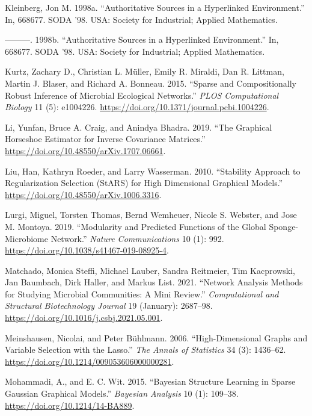 \documentclass[
  a4paper,
]{article}
\newlength{\cslhangindent}
\newlength{\cslentryspacingunit} %
\newenvironment{CSLReferences}[2] %
 {%
  \setlength{\parindent}{0pt}
  \ifodd #1
  \let\oldpar\par
  \def\par{\hangindent=\cslhangindent\oldpar}
  \fi
  \setlength{\parskip}{#2\cslentryspacingunit}
 }%
 {}
\begin{document}
\begin{CSLReferences}{1}{0}
\leavevmode{}%
Kleinberg, Jon M. 1998a. {``Authoritative Sources in a Hyperlinked
Environment.''} In, 668677. SODA '98. USA: Society for Industrial;
Applied Mathematics.

\leavevmode{}%
---------. 1998b. {``Authoritative Sources in a Hyperlinked
Environment.''} In, 668677. SODA '98. USA: Society for Industrial;
Applied Mathematics.

\leavevmode{}%
Kurtz, Zachary D., Christian L. Müller, Emily R. Miraldi, Dan R.
Littman, Martin J. Blaser, and Richard A. Bonneau. 2015. {``Sparse and
Compositionally Robust Inference of Microbial Ecological Networks.''}
\emph{PLOS Computational Biology} 11 (5): e1004226.
\url{https://doi.org/10.1371/journal.pcbi.1004226}.

\leavevmode{}%
Li, Yunfan, Bruce A. Craig, and Anindya Bhadra. 2019. {``The Graphical
Horseshoe Estimator for Inverse Covariance Matrices.''}
\url{https://doi.org/10.48550/arXiv.1707.06661}.

\leavevmode{}%
Liu, Han, Kathryn Roeder, and Larry Wasserman. 2010. {``Stability
Approach to Regularization Selection (StARS) for High Dimensional
Graphical Models.''} \url{https://doi.org/10.48550/arXiv.1006.3316}.

\leavevmode{}%
Lurgi, Miguel, Torsten Thomas, Bernd Wemheuer, Nicole S. Webster, and
Jose M. Montoya. 2019. {``Modularity and Predicted Functions of the
Global Sponge-Microbiome Network.''} \emph{Nature Communications} 10
(1): 992. \url{https://doi.org/10.1038/s41467-019-08925-4}.

\leavevmode{}%
Matchado, Monica Steffi, Michael Lauber, Sandra Reitmeier, Tim
Kacprowski, Jan Baumbach, Dirk Haller, and Markus List. 2021. {``Network
Analysis Methods for Studying Microbial Communities: A Mini Review.''}
\emph{Computational and Structural Biotechnology Journal} 19 (January):
2687--98. \url{https://doi.org/10.1016/j.csbj.2021.05.001}.

\leavevmode{}%
Meinshausen, Nicolai, and Peter Bühlmann. 2006. {``High-Dimensional
Graphs and Variable Selection with the Lasso.''} \emph{The Annals of
Statistics} 34 (3): 1436--62.
\url{https://doi.org/10.1214/009053606000000281}.

\leavevmode{}%
Mohammadi, A., and E. C. Wit. 2015. {``Bayesian Structure Learning in
Sparse Gaussian Graphical Models.''} \emph{Bayesian Analysis} 10 (1):
109--38. \url{https://doi.org/10.1214/14-BA889}.


\end{CSLReferences}
\end{document}
